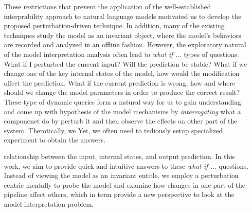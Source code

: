 These restrictions that prevent the application of the well-established interprability approach to natural language models motivated us to develop the proposed perturbation-driven technique.
%
In addition, many of the existing techniques study the model as an invariant object, where the model's behaviors are recorded and analyzed in an offline fashion.
%
However, the exploratory natural of the model interpretation analysis often lead to \emph{what if ...} types of questions. What if I perturbed the current input? Will the prediction be stable? What if we change one of the key internal states of the model, how would the modification affect the prediction. What if the current prediction is wrong, how and where should we change the model parameters in order to produce the correct result? These type of dynamic queries form a natural way for us to gain understanding and come up with hypothesis of the model mechanisms by \emph{interrogating} what a componenet do by perturb it and then observe the effects on other part of the system. Therotically, we  Yet, we often need to tediously setup specialized experiment to obtain the answers.

relationship between the input, internal states, and output prediction.
In this work, we aim to provide quick and intuitive answers to these \emph{what if ...} questions. Instead of viewing the model as an invariant entitle, we employ a perturbation centric mentally to probe the model and examine how changes in one part of the pipeline affect others, which in term provide a new perspective to look at the model interpretation problem.








